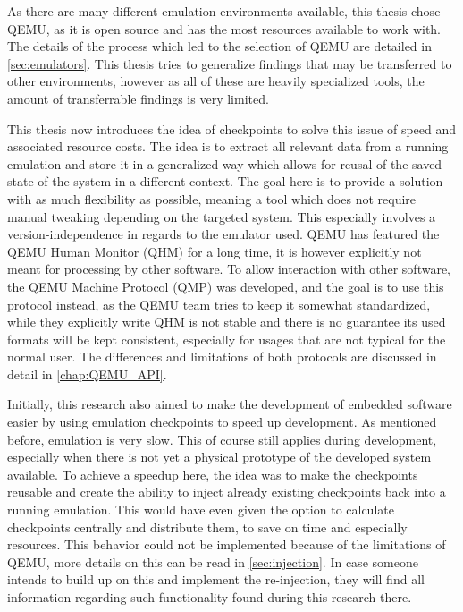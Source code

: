 As there are many different emulation environments available,
this thesis chose QEMU, as it is open source and has the most resources available to work with.
The details of the process which led to the selection of QEMU are detailed in \autoref{sec:emulators}.
This thesis tries to generalize findings that may be transferred to other environments,
however as all of these are heavily specialized tools,
the amount of transferrable findings is very limited.

This thesis now introduces the idea of checkpoints to solve this issue of speed and associated resource costs.
The idea is to extract all relevant data from a running emulation
and store it in a generalized way which allows for reusal of the saved state of the system in a different context.
The goal here is to provide a solution with as much flexibility as possible,
meaning a tool which does not require manual tweaking depending on the targeted system.
This especially involves a version-independence in regards to the emulator used.
QEMU has featured the QEMU Human Monitor (QHM) for a long time,
it is however explicitly not meant for processing by other software.
To allow interaction with other software, the QEMU Machine Protocol (QMP) was developed, and the goal is to use this protocol instead,
as the QEMU team tries to keep it somewhat standardized,
while they explicitly write QHM is not stable and there is no guarantee its used formats will be kept consistent,
especially for usages that are not typical for the normal user.
The differences and limitations of both protocols are discussed in detail in \autoref{chap:QEMU_API}.

Initially, this research also aimed to make the development of embedded software easier by using emulation checkpoints to speed up development.
As mentioned before, emulation is very slow.
This of course still applies during development, especially when there is not yet a physical prototype of the developed system available.
To achieve a speedup here, the idea was to make the checkpoints reusable
and create the ability to inject already existing checkpoints back into a running emulation.
This would have even given the option to calculate checkpoints centrally and distribute them,
to save on time and especially resources.
This behavior could not be implemented because of the  limitations of QEMU,
more details on this can be read in \autoref{sec:injection}.
In case someone intends to build up on this and implement the re-injection,
they will find all information regarding such functionality found during this research there.

